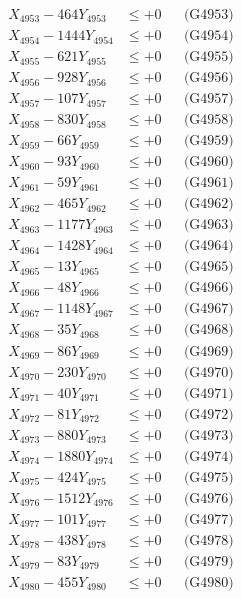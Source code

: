 \documentclass[a4paper,10pt]{article}
\begin{document}
{\begin{align}
X_{4953} - 464Y_{4953} &\leq +0 && \text{(G4953)} \\
X_{4954} - 1444Y_{4954} &\leq +0 && \text{(G4954)} \\
X_{4955} - 621Y_{4955} &\leq +0 && \text{(G4955)} \\
X_{4956} - 928Y_{4956} &\leq +0 && \text{(G4956)} \\
X_{4957} - 107Y_{4957} &\leq +0 && \text{(G4957)} \\
X_{4958} - 830Y_{4958} &\leq +0 && \text{(G4958)} \\
X_{4959} - 66Y_{4959} &\leq +0 && \text{(G4959)} \\
X_{4960} - 93Y_{4960} &\leq +0 && \text{(G4960)} \\
\allowbreak
X_{4961} - 59Y_{4961} &\leq +0 && \text{(G4961)} \\
X_{4962} - 465Y_{4962} &\leq +0 && \text{(G4962)} \\
X_{4963} - 1177Y_{4963} &\leq +0 && \text{(G4963)} \\
X_{4964} - 1428Y_{4964} &\leq +0 && \text{(G4964)} \\
X_{4965} - 13Y_{4965} &\leq +0 && \text{(G4965)} \\
X_{4966} - 48Y_{4966} &\leq +0 && \text{(G4966)} \\
X_{4967} - 1148Y_{4967} &\leq +0 && \text{(G4967)} \\
X_{4968} - 35Y_{4968} &\leq +0 && \text{(G4968)} \\
X_{4969} - 86Y_{4969} &\leq +0 && \text{(G4969)} \\
X_{4970} - 230Y_{4970} &\leq +0 && \text{(G4970)} \\
\allowbreak
X_{4971} - 40Y_{4971} &\leq +0 && \text{(G4971)} \\
X_{4972} - 81Y_{4972} &\leq +0 && \text{(G4972)} \\
X_{4973} - 880Y_{4973} &\leq +0 && \text{(G4973)} \\
X_{4974} - 1880Y_{4974} &\leq +0 && \text{(G4974)} \\
X_{4975} - 424Y_{4975} &\leq +0 && \text{(G4975)} \\
X_{4976} - 1512Y_{4976} &\leq +0 && \text{(G4976)} \\
X_{4977} - 101Y_{4977} &\leq +0 && \text{(G4977)} \\
X_{4978} - 438Y_{4978} &\leq +0 && \text{(G4978)} \\
X_{4979} - 83Y_{4979} &\leq +0 && \text{(G4979)} \\
X_{4980} - 455Y_{4980} &\leq +0 && \text{(G4980)} \\

\end{align}}
\end{document}

